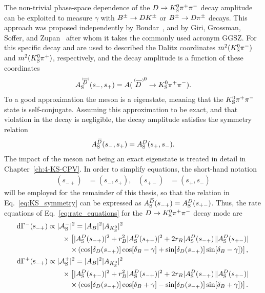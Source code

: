 The non-trivial phase-space dependence of the ${D}\rightarrow{\ensuremath{{K}^0_{\mathrm{S}}}}{\ensuremath{{\pi}^+}}{\ensuremath{{\pi}^-}}$ decay amplitude can be exploited to measure $\gamma$ with ${{B}^\pm}\rightarrow {\ensuremath{D}}{\ensuremath{{K}^\pm}}$ or ${{B}^\pm}\rightarrow {\ensuremath{D}}{\ensuremath{{\pi}^\pm}}$ decays. This approach was proposed independently by Bondar~\cite{BONDARGGSZ}, and by Giri, Grossman, Soffer, and Zupan~\cite{giriDeterminingEnsuremathGamma2003} after whom it takes the commonly used acronym GGSZ. For this specific decay \sm and \sp are used to described the Dalitz coordinates $m^2({{K}^0_{\mathrm{S}}}{{\pi}^-})$ and $m^2({{K}^0_{\mathrm{S}}}{{\pi}^+})$, respectively, and the \D decay amplitude is a function of these coordinates
\begin{align}\label{eq:ADDb_definition}
\ADorDbS (\smpLong)= A(\DorDbar^0\to K^0_\text{S} \pi^+\pi^-).
\end{align}
To a good approximation the \KS meson is a \CP eigenstate, meaning that the ${{K}^0_{\mathrm{S}}}{{\pi}^+}{{\pi}^-}$ state is self-conjugate. Assuming this approximation to be exact, and that \CP violation in the \D decay is negligible, the \D decay amplitude satisfies the symmetry relation
\begin{align}\label{eq:KS_symmetry}
     A_{\rm S}^{{\kern 0.18em\overline{\kern -0.18em D}}}(s_-, s_+)=A_{\rm S}^{D}(s_+, s_-).
 \end{align} 
 The impact of the \KS meson \emph{not} being an exact \CP eigenstate is treated in detail in Chapter~\ref{ch:4-KS-CPV}. In order to simplify equations, the short-hand notation 
 \begin{align}
     (s_{-+})&=(s_-,s_+), &(s_{+-})&=(s_+,s_-)
 \end{align} will be employed for the remainder of this thesis, so that the relation in Eq.~\eqref{eq:KS_symmetry} can be expressed as $A_{\rm S}^{{\kern 0.18em\overline{\kern -0.18em D}}}(s_{-+})=A_{\rm S}^{D}(s_{+-})$. Thus, the rate equations of Eq.~\eqref{eq:rate_equations} for the ${D}\rightarrow{\ensuremath{{K}^0_{\mathrm{S}}}}{\ensuremath{{\pi}^+}}{\ensuremath{{\pi}^-}}$ decay mode are
 \begin{subequations}
\begin{align} \label{eq:Gamma_Bminus}
    \rm {d} \Gamma^-(s_{-+}) &\propto |\mathcal{A}_{\rm S}^-|^2 = |A_{B}|^2|A_{{{K}^0_{\mathrm{S}}}}|^2 \notag \\
    &\qquad\times\left[|A_{\rm S}^{D}(s_{-+})|^2 + r_{B}^2 |A_{\rm S}^{D}(s_{+-})|^2 + 2r_{B} |A_{\rm S}^{D}(s_{-+})||A_{\rm S}^{D}(s_{+-})|\right .
    \notag \\
    &\quad\qquad \left. \times \left(\cos[\delta_D(s_{-+})]\cos[\delta_{B}-\gamma]+\sin[\delta_D(s_{-+})]\sin[\delta_{B}-\gamma]\right)\right], \\
    \rm {d} \Gamma^+(s_{-+}) &\propto |\mathcal{A}_{\rm S}^+|^2 = |A_{B}|^2|A_{{{K}^0_{\mathrm{S}}}}|^2 \notag \\
    &\qquad\times\left[|A_{\rm S}^{D}(s_{+-})|^2 + r_{B}^2 |A_{\rm S}^{D}(s_{-+})|^2 + 2r_{B} |A_{\rm S}^{D}(s_{-+})||A_{\rm S}^{D}(s_{+-})|\right .
    \notag \\
    &\quad\qquad \left. \times \left(\cos[\delta_D(s_{-+})]\cos[\delta_{B}+\gamma]-\sin[\delta_D(s_{-+})]\sin[\delta_{B}+\gamma]\right)\right].
\end{align}
\end{subequations}
